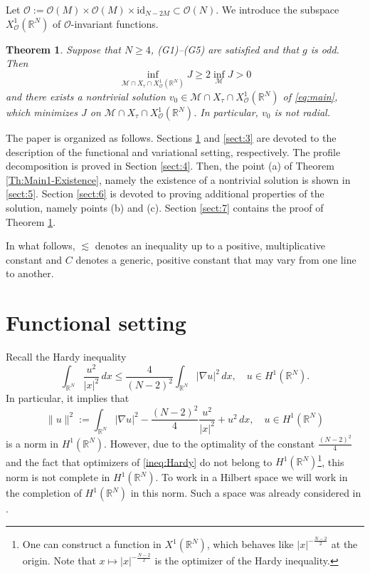 \documentclass[12pt,leqno,twoside,sort]{amsart}
\newtheorem{Th}{Theorem}[section]
\newcommand{\R}{\mathbb{R}}
\newcommand{\cM}{{\mathcal M}}
\numberwithin{equation}{section}
\begin{document}
Let $\mathcal{O} := \mathcal{O}(M) \times \mathcal{O}(M) \times \mathrm{id}_{N-2M} \subset \mathcal{O}(N)$. We introduce the subspace $X^1_\mathcal{O} (\R^N)$ of $\mathcal{O}$-invariant functions.

\begin{Th}\label{Th:Main2}
Suppose that $N\geq 4$, (G1)--(G5) are satisfied and that $g$ is odd. Then
$$
\inf_{\cM \cap X_\tau \cap X^1_{\mathcal{O}} (\R^N)} J \geq 2 \inf_{\cM} J > 0
$$
and there exists a nontrivial solution $v_0 \in \cM \cap X_\tau \cap X^1_{\mathcal{O}} (\R^N)$ of \eqref{eq:main}, which minimizes $J$ on $\cM \cap X_\tau \cap X^1_{\mathcal{O}} (\R^N)$. In particular, $v_0$ is not radial.
\end{Th}

The paper is organized as follows. Sections \ref{sect:2} and \ref{sect:3} are devoted to the description of the functional and variational setting, respectively. The profile decomposition is proved in Section \ref{sect:4}. Then, the point (a) of Theorem \ref{Th:Main1-Existence}, namely the existence of a nontrivial solution is shown in \ref{sect:5}. Section \ref{sect:6} is devoted to proving additional properties of the solution, namely points (b) and (c). Section \ref{sect:7} contains the proof of Theorem \ref{Th:Main2}. 



In what follows, $\lesssim$ denotes an inequality up to a positive, multiplicative constant and $C$ denotes a generic, positive constant that may vary from one line to another. 




\section{Functional setting}\label{sect:2}

Recall the Hardy inequality
\begin{equation} \label{ineq:Hardy}
 \int_{\R^N} \frac{u^2}{|x|^2} \, dx \leq \frac{4}{(N-2)^2} \int_{\R^N} |\nabla u|^2 \, dx, \quad u \in H^1 (\R^N).   
\end{equation}
In particular, it implies that
$$
\| u \|^2 := \int_{\R^N} |\nabla u|^2 - \frac{(N-2)^2}{4} \frac{u^2}{|x|^2} + u^2 \, dx, \quad u \in H^1 (\R^N)
$$
is a norm in $H^1 (\R^N)$. However, due to the optimality of the constant $\frac{(N-2)^2}{4}$ and the fact that optimizers of \eqref{ineq:Hardy} do not belong to $H^1(\R^N)$\footnote{One can construct a function in $X^1 (\R^N)$, which behaves like $|x|^{- \frac{N-2}{2}}$ at the origin. Note that $x \mapsto |x|^{- \frac{N-2}{2}}$ is the optimizer of the Hardy inequality.}, this norm is not complete in $H^1 (\R^N)$. To work in a Hilbert space we will work in the completion of $H^1 (\R^N)$ in this norm. Such a space was already considered in \cite{Suzuki, Mukherjee, TrachanasZographopoulos, TrachanasZographopoulosCor}.  
\end{document}
